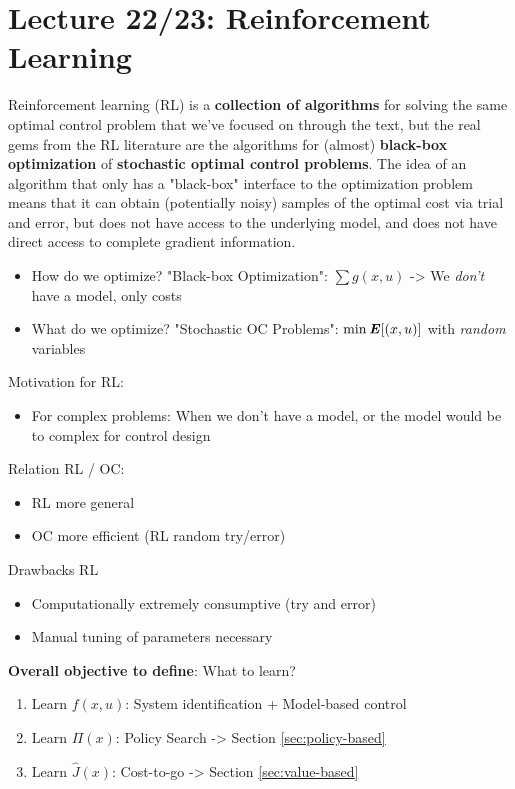 \chapter{Lecture 22/23: Reinforcement Learning}
Reinforcement learning (RL) is a \textbf{collection of algorithms} for solving the same optimal control problem that we've focused on through the text, but the real gems from the RL literature are the algorithms for (almost) \textbf{black-box optimization} of \textbf{stochastic optimal control problems}. The idea of an algorithm that only has a "black-box" interface to the optimization problem means that it can obtain (potentially noisy) samples of the optimal cost via trial and error, but does not have access to the underlying model, and does not have direct access to complete gradient information.

\begin{itemize}
\item How do we optimize? "Black-box Optimization": $\sum g(x,u)$ -> We \textit{don't} have a model, only costs
\item What do we optimize? "Stochastic OC Problems": $\min \bm{\mathit{E}}[(x,u)]$ with \textit{random} variables
\end{itemize}

Motivation for RL:
\begin{itemize}
\item For complex problems: When we don't have a model, or the model would be to complex for control design
\end{itemize}

Relation RL / OC:
\begin{itemize}
\item RL more general 
\item OC more efficient (RL random try/error)
\end{itemize}

Drawbacks RL
\begin{itemize}
\item Computationally extremely consumptive (try and error)
\item Manual tuning of parameters necessary
\end{itemize}

\textbf{Overall objective to define}: What to learn? 
\begin{enumerate}
\item Learn $f(x,u)$: System identification + Model-based control
\item Learn $\Pi(x)$: Policy Search -> Section \ref{sec:policy-based}
\item Learn $\hat{J}(x)$: Cost-to-go -> Section \ref{sec:value-based}
\end{enumerate}

